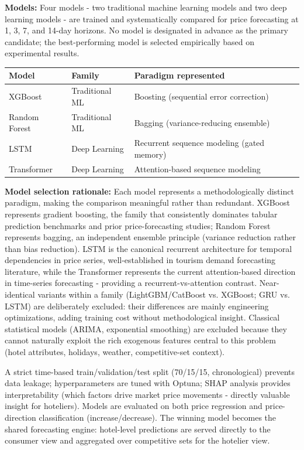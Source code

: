 \documentclass[11pt,a4paper]{article}
\newcommand{\entry}[1]{\par\hspace*{1.5em}#1}
\begin{document}
\entry{\textbf{Models:} Four models - two traditional machine learning models and
two deep learning models - are trained and systematically compared for
price forecasting at 1, 3, 7, and 14-day horizons. No model is designated in
advance as the primary candidate; the best-performing model is selected
empirically based on experimental results.}

\begin{center}
\begin{tabular}{lll}
\toprule
Model & Family & Paradigm represented \\
\midrule
XGBoost & Traditional ML & Boosting (sequential error correction) \\
Random Forest & Traditional ML & Bagging (variance-reducing ensemble) \\
LSTM & Deep Learning & Recurrent sequence modeling (gated memory) \\
Transformer & Deep Learning & Attention-based sequence modeling \\
\bottomrule
\end{tabular}
\end{center}

\entry{\textbf{Model selection rationale:} Each model represents a methodologically
distinct paradigm, making the comparison meaningful rather than redundant.
XGBoost represents gradient boosting, the family that consistently dominates
tabular prediction benchmarks and prior price-forecasting studies; Random
Forest represents bagging, an independent ensemble principle (variance
reduction rather than bias reduction). LSTM is the canonical recurrent
architecture for temporal dependencies in price series, well-established in
tourism demand forecasting literature, while the Transformer represents the
current attention-based direction in time-series forecasting - providing a
recurrent-vs-attention contrast. Near-identical variants within a family
(LightGBM/CatBoost vs. XGBoost; GRU vs. LSTM) are deliberately excluded:
their differences are mainly engineering optimizations, adding training cost
without methodological insight. Classical statistical models (ARIMA,
exponential smoothing) are excluded because they cannot naturally exploit
the rich exogenous features central to this problem (hotel attributes,
holidays, weather, competitive-set context).}

A strict time-based train/validation/test split (70/15/15, chronological)
prevents data leakage; hyperparameters are tuned with Optuna; SHAP analysis
provides interpretability (which factors drive market price movements -
directly valuable insight for hoteliers). Models are evaluated on both price
regression and price-direction classification (increase/decrease). The
winning model becomes the shared forecasting engine: hotel-level predictions
are served directly to the consumer view and aggregated over competitive
sets for the hotelier view.
\end{document}
